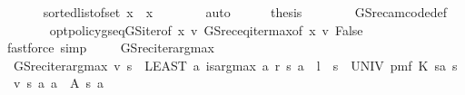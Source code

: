 \begin{isabellebody}
\ \ \ \ \isamarkupfalse%
\ {\isacharasterisk}{\kern0pt}{\isacharcolon}{\kern0pt}\ {\isachardoublequoteopen}{\isacharparenleft}{\kern0pt}sorted{\isacharunderscore}{\kern0pt}list{\isacharunderscore}{\kern0pt}of{\isacharunderscore}{\kern0pt}set\ {\isacharbraceleft}{\kern0pt}{\isachardot}{\kern0pt}{\isachardot}{\kern0pt}x{\isacharbraceright}{\kern0pt}{\isacharparenright}{\kern0pt}\ {\isacharequal}{\kern0pt}\ {\isacharbrackleft}{\kern0pt}x{\isacharbrackright}{\kern0pt}{\isachardoublequoteclose}\isanewline
\ \ \ \ \ \ \isamarkupfalse%
\ auto\isanewline
\ \ \ \ \isamarkupfalse%
\ {\isacharquery}{\kern0pt}thesis\isanewline
\ \ \ \ \ \ \isamarkupfalse%
\ GS{\isacharunderscore}{\kern0pt}rec{\isacharunderscore}{\kern0pt}am{\isacharunderscore}{\kern0pt}code{\isacharunderscore}{\kern0pt}def\isanewline
\ \ \ \ \ \ \isamarkupfalse%
\ opt{\isacharunderscore}{\kern0pt}policy{\isacharunderscore}{\kern0pt}gs{\isacharprime}{\kern0pt}{\isacharunderscore}{\kern0pt}eq{\isacharunderscore}{\kern0pt}GS{\isacharunderscore}{\kern0pt}iter{\isacharbrackleft}{\kern0pt}of\ x\ v{\isacharbrackright}{\kern0pt}\ GS{\isacharunderscore}{\kern0pt}rec{\isacharunderscore}{\kern0pt}eq{\isacharunderscore}{\kern0pt}iter{\isacharunderscore}{\kern0pt}max{\isacharbrackleft}{\kern0pt}of\ x\ v{\isacharbrackright}{\kern0pt}\ False\ \isanewline
\ \ \ \ \ \ \isamarkupfalse%
\ {\isacharparenleft}{\kern0pt}fastforce\ simp{\isacharcolon}{\kern0pt}\ {\isacharasterisk}{\kern0pt}{\isacharparenright}{\kern0pt}\isanewline
\ \ \isamarkupfalse%
\isanewline
{}\isamarkupfalse%
%
\endisatagproof
{\isafoldproof}%
%
\isadelimproof
\isanewline
%
\endisadelimproof
\isanewline
{}\isamarkupfalse%
\ GS{\isacharunderscore}{\kern0pt}rec{\isacharunderscore}{\kern0pt}iter{\isacharunderscore}{\kern0pt}arg{\isacharunderscore}{\kern0pt}max\ \isanewline
\ \ {\isachardoublequoteopen}GS{\isacharunderscore}{\kern0pt}rec{\isacharunderscore}{\kern0pt}iter{\isacharunderscore}{\kern0pt}arg{\isacharunderscore}{\kern0pt}max\ v\ s\ {\isacharequal}{\kern0pt}\ {\isacharparenleft}{\kern0pt}LEAST\ a{\isachardot}{\kern0pt}\ is{\isacharunderscore}{\kern0pt}arg{\isacharunderscore}{\kern0pt}max\ {\isacharparenleft}{\kern0pt}{\isasymlambda}a{\isachardot}{\kern0pt}\ r\ {\isacharparenleft}{\kern0pt}s{\isacharcomma}{\kern0pt}\ a{\isacharparenright}{\kern0pt}\ {\isacharplus}{\kern0pt}\ l\ {\isacharasterisk}{\kern0pt}\ {\isacharparenleft}{\kern0pt}{\isasymSum}s{\isacharprime}{\kern0pt}\ {\isasymin}\ UNIV{\isachardot}{\kern0pt}\ pmf\ {\isacharparenleft}{\kern0pt}K\ {\isacharparenleft}{\kern0pt}s{\isacharcomma}{\kern0pt}a{\isacharparenright}{\kern0pt}{\isacharparenright}{\kern0pt}\ s{\isacharprime}{\kern0pt}\ {\isacharasterisk}{\kern0pt}\ v\ s{\isacharprime}{\kern0pt}{\isacharparenright}{\kern0pt}{\isacharparenright}{\kern0pt}\ {\isacharparenleft}{\kern0pt}{\isasymlambda}a{\isachardot}{\kern0pt}\ a\ {\isasymin}\ A\ s{\isacharparenright}{\kern0pt}\ a{\isacharparenright}{\kern0pt}{\isachardoublequoteclose}\isanewline

\end{isabellebody}
